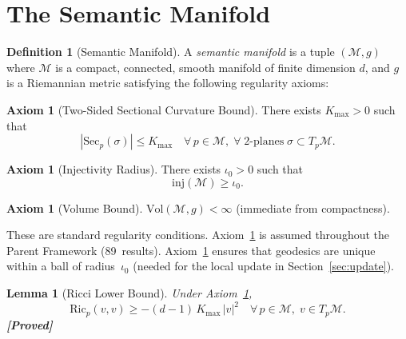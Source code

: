 \documentclass[11pt,a4paper]{article}
\newtheorem{lemma}[theorem]{Lemma}
\theoremstyle{definition}
\newtheorem{definition}[theorem]{Definition}
\newtheorem{axiom}[theorem]{Axiom}
\theoremstyle{remark}
\newcommand{\Mman}{(\mathcal{M}, g)}
\newcommand{\Ric}{\mathrm{Ric}}
\newcommand{\Sec}{\mathrm{Sec}}
\newcommand{\inj}{\mathrm{inj}}
\newcommand{\Vol}{\mathrm{Vol}}
\newcommand{\statusproved}{\textcolor{green!50!black}{\textbf{[Proved]}}}
\begin{document}
\section{The Semantic Manifold}\label{sec:manifold}

\begin{definition}[Semantic Manifold]\label{def:manifold}
A \emph{semantic manifold} is a tuple $\Mman$ where $\mathcal{M}$ 
is a compact, connected, smooth manifold of finite dimension $d$, 
and $g$ is a Riemannian metric satisfying the following regularity 
axioms:
\end{definition}


\begin{axiom}[Two-Sided Sectional Curvature Bound]\label{ax:curvature}
There exists $K_{\max} > 0$ such that
\begin{equation}\label{eq:curvature_bound}
    |\Sec_p(\sigma)| \leq K_{\max} \quad 
    \forall\, p \in \mathcal{M},\; 
    \forall\; \text{2-planes}\; \sigma \subset T_p\mathcal{M}.
\end{equation}
\end{axiom}

\begin{axiom}[Injectivity Radius]\label{ax:injectivity}
There exists $\iota_0 > 0$ such that
\begin{equation}\label{eq:injectivity}
    \inj(\mathcal{M}) \geq \iota_0.
\end{equation}
\end{axiom}

\begin{axiom}[Volume Bound]\label{ax:volume}
$\Vol(\mathcal{M}, g) < \infty$ (immediate from compactness).
\end{axiom}

These are standard regularity conditions. 
Axiom~\ref{ax:curvature} is assumed throughout the Parent 
Framework (89~results). Axiom~\ref{ax:injectivity} ensures that 
geodesics are unique within a ball of radius~$\iota_0$ (needed 
for the local update in Section~\ref{sec:update}).

\begin{lemma}[Ricci Lower Bound]\label{lem:ricci}
Under Axiom~\ref{ax:curvature},
\begin{equation}\label{eq:ricci_lower}
    \Ric_p(v,v) \geq -(d-1)\,K_{\max}\,|v|^2 
    \quad \forall\, p \in \mathcal{M},\; v \in T_p\mathcal{M}.
\end{equation}
\statusproved
\end{lemma}
\end{document}
